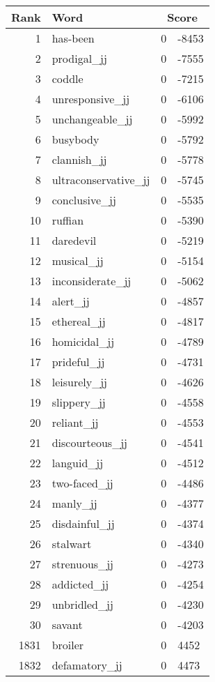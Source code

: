 \begin{longtable}[!htbp]{| rlr@{.}l |}
    \hline
    \textbf{Rank} & \textbf{Word} & \multicolumn{2}{c|}{\textbf{Score}} \\
    \hline
    \endhead
    1 & has-been & 0 & -8453 \\
    2 & prodigal\_jj & 0 & -7555 \\
    3 & coddle & 0 & -7215 \\
    4 & unresponsive\_jj & 0 & -6106 \\
    5 & unchangeable\_jj & 0 & -5992 \\
    6 & busybody & 0 & -5792 \\
    7 & clannish\_jj & 0 & -5778 \\
    8 & ultraconservative\_jj & 0 & -5745 \\
    9 & conclusive\_jj & 0 & -5535 \\
    10 & ruffian & 0 & -5390 \\
    11 & daredevil & 0 & -5219 \\
    12 & musical\_jj & 0 & -5154 \\
    13 & inconsiderate\_jj & 0 & -5062 \\
    14 & alert\_jj & 0 & -4857 \\
    15 & ethereal\_jj & 0 & -4817 \\
    16 & homicidal\_jj & 0 & -4789 \\
    17 & prideful\_jj & 0 & -4731 \\
    18 & leisurely\_jj & 0 & -4626 \\
    19 & slippery\_jj & 0 & -4558 \\
    20 & reliant\_jj & 0 & -4553 \\
    21 & discourteous\_jj & 0 & -4541 \\
    22 & languid\_jj & 0 & -4512 \\
    23 & two-faced\_jj & 0 & -4486 \\
    24 & manly\_jj & 0 & -4377 \\
    25 & disdainful\_jj & 0 & -4374 \\
    26 & stalwart & 0 & -4340 \\
    27 & strenuous\_jj & 0 & -4273 \\
    28 & addicted\_jj & 0 & -4254 \\
    29 & unbridled\_jj & 0 & -4230 \\
    30 & savant & 0 & -4203 \\
    1831 & broiler & 0 & 4452 \\
    1832 & defamatory\_jj & 0 & 4473 \\

\end{longtable}
